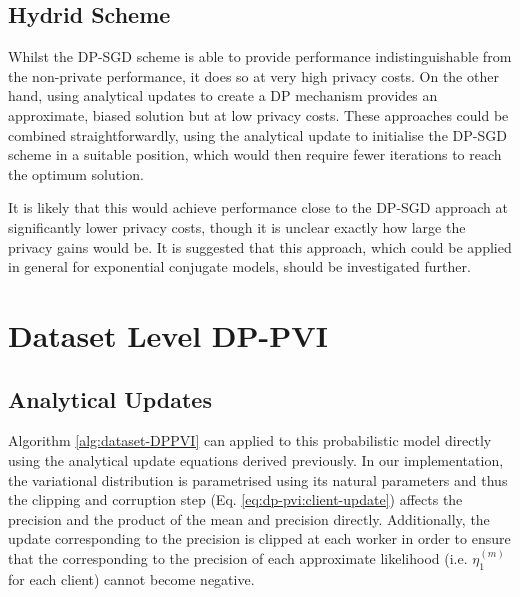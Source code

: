 \subsection{Hydrid Scheme}
Whilst the DP-SGD scheme is able to provide performance indistinguishable from the non-private performance, it does so at very high privacy costs. On the other hand, using analytical updates to create a DP mechanism provides an approximate, biased solution but at low privacy costs. These approaches could be combined straightforwardly, using the analytical update to initialise the DP-SGD scheme in a suitable position, which would then require fewer iterations to reach the optimum solution. 

It is likely that this would achieve performance close to the DP-SGD approach at significantly lower privacy costs, though it is unclear exactly how large the privacy gains would be. It is suggested that this approach, which could be applied in general for exponential conjugate models, should be investigated further.

\section{Dataset Level DP-PVI}
\subsection{Analytical Updates}
Algorithm \ref{alg:dataset-DPPVI} can applied to this probabilistic model directly using the analytical update equations derived previously. In our implementation, the variational distribution is parametrised using its natural parameters and thus the clipping and corruption step (Eq. \ref{eq:dp-pvi:client-update}) affects the precision and the product of the mean and precision directly.  Additionally, the update corresponding to the precision is clipped at each worker in order to ensure that the corresponding to the precision of each approximate likelihood (i.e. $\eta_1^{(m)}$ for each client) cannot become negative. 

